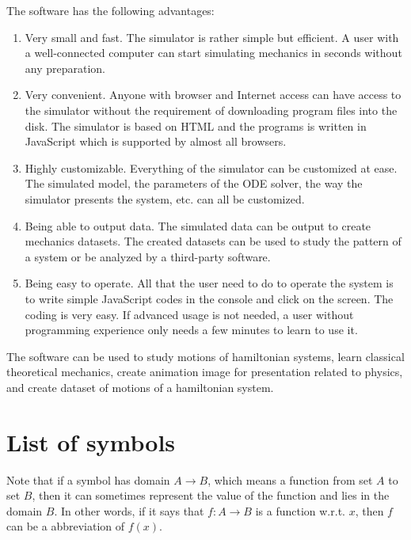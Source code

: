 \documentclass[12pt]{article}
\begin{document}
The software has the following advantages:
\begin{enumerate}
  \item Very small and fast.
  The simulator is rather simple but efficient.
  A user with a well-connected computer can start simulating mechanics in seconds without any preparation.

  \item Very convenient.
  Anyone with browser and Internet access can have access to the simulator without the requirement of downloading program files into the disk.
  The simulator is based on HTML and the programs is written in JavaScript which is supported by almost all browsers.

  \item Highly customizable.
  Everything of the simulator can be customized at ease.
  The simulated model, the parameters of the ODE solver, the way the simulator presents the system, etc. can all be customized.

  \item Being able to output data.
  The simulated data can be output to create mechanics datasets.
  The created datasets can be used to study the pattern of a system or be analyzed by a third-party software.

  \item Being easy to operate.
  All that the user need to do to operate the system is to write simple JavaScript codes in the console and click on the screen.
  The coding is very easy.
  If advanced usage is not needed, a user without programming experience only needs a few minutes to learn to use it.
\end{enumerate}

The software can be used to study motions of hamiltonian systems,
learn classical theoretical mechanics,
create animation image for presentation related to physics,
and create dataset of motions of a hamiltonian system.

\section{List of symbols}

Note that if a symbol has domain $A\rightarrow B$,
which means a function from set $A$ to set $B$,
then it can sometimes represent the value of the function
and lies in the domain $B$.
In other words, if it says that $f:A\rightarrow B$ is a function w.r.t. $x$,
then $f$ can be a abbreviation of $f\left(x\right)$.
\end{document}
